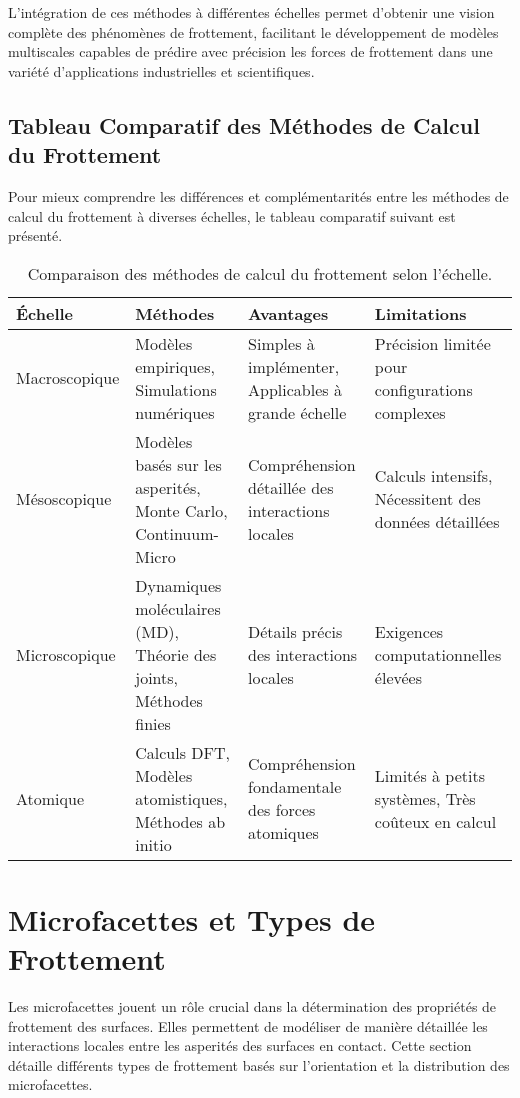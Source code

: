 L'intégration de ces méthodes à différentes échelles permet d'obtenir une vision complète des phénomènes de frottement, facilitant le développement de modèles multiscales capables de prédire avec précision les forces de frottement dans une variété d'applications industrielles et scientifiques.

\subsection{Tableau Comparatif des Méthodes de Calcul du Frottement}

Pour mieux comprendre les différences et complémentarités entre les méthodes de calcul du frottement à diverses échelles, le tableau comparatif suivant est présenté.

\begin{table}[h]
    \centering
    \begin{tabular}{|l|l|l|l|}
        \hline
        \textbf{Échelle} & \textbf{Méthodes} & \textbf{Avantages} & \textbf{Limitations} \\ \hline
        Macroscopique & Modèles empiriques, Simulations numériques & Simples à implémenter, Applicables à grande échelle & Précision limitée pour configurations complexes \\ \hline
        Mésoscopique & Modèles basés sur les asperités, Monte Carlo, Continuum-Micro & Compréhension détaillée des interactions locales & Calculs intensifs, Nécessitent des données détaillées \\ \hline
        Microscopique & Dynamiques moléculaires (MD), Théorie des joints, Méthodes finies & Détails précis des interactions locales & Exigences computationnelles élevées \\ \hline
        Atomique & Calculs DFT, Modèles atomistiques, Méthodes ab initio & Compréhension fondamentale des forces atomiques & Limités à petits systèmes, Très coûteux en calcul \\ \hline
    \end{tabular}
    \caption{Comparaison des méthodes de calcul du frottement selon l'échelle.}
    \label{tab:comparaison_methodes_frottement}
\end{table}

\section{Microfacettes et Types de Frottement}

Les microfacettes jouent un rôle crucial dans la détermination des propriétés de frottement des surfaces. Elles permettent de modéliser de manière détaillée les interactions locales entre les asperités des surfaces en contact. Cette section détaille différents types de frottement basés sur l'orientation et la distribution des microfacettes.

